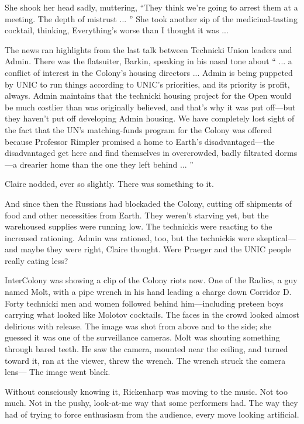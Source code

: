 She shook her head sadly, muttering, ``They think we're going to arrest them at a meeting. The depth of mistrust ... '' She took another sip of the medicinal-tasting cocktail, thinking, Everything's worse than I thought it was ...

The news ran highlights from the last talk between Technicki Union leaders and Admin. There was the flatsuiter, Barkin, speaking in his nasal tone about `` ... a conflict of interest in the Colony's housing directors ... Admin is being puppeted by UNIC to run things according to UNIC's priorities, and its priority is profit, always. Admin maintains that the technicki housing project for the Open would be much costlier than was originally believed, and that's why it was put off—but they haven't put off developing Admin housing. We have completely lost sight of the fact that the UN's matching-funds program for the Colony was offered because Professor Rimpler promised a home to Earth's disadvantaged—the disadvantaged get here and find themselves in overcrowded, badly filtrated dorms—a drearier home than the one they left behind ... ''

Claire nodded, ever so slightly. There was something to it.

And since then the Russians had blockaded the Colony, cutting off shipments of food and other necessities from Earth. They weren't starving yet, but the warehoused supplies were running low. The technickis were reacting to the increased rationing. Admin was rationed, too, but the technickis were skeptical—and maybe they were right, Claire thought. Were Praeger and the UNIC people really eating less?

InterColony was showing a clip of the Colony riots now. One of the Radics, a guy named Molt, with a pipe wrench in his hand leading a charge down Corridor D. Forty technicki men and women followed behind him—including preteen boys carrying what looked like Molotov cocktails. The faces in the crowd looked almost delirious with release. The image was shot from above and to the side; she guessed it was one of the surveillance cameras. Molt was shouting something through bared teeth. He saw the camera, mounted near the ceiling, and turned toward it, ran at the viewer, threw the wrench. The wrench struck the camera lens— The image went black.

Without consciously knowing it, Rickenharp was moving to the music. Not too much. Not in the pushy, look-at-me way that some performers had. The way they had of trying to force enthusiasm from the audience, every move looking artificial.

